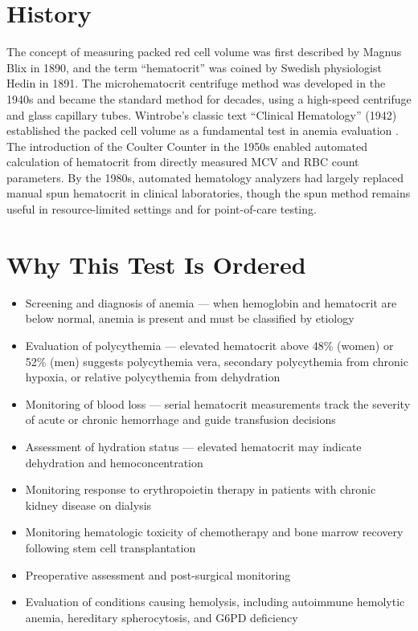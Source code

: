 \section*{History}
The concept of measuring packed red cell volume was first described by Magnus Blix in 1890, and the term ``hematocrit'' was coined by Swedish physiologist Hedin in 1891. The microhematocrit centrifuge method was developed in the 1940s and became the standard method for decades, using a high-speed centrifuge and glass capillary tubes. Wintrobe's classic text ``Clinical Hematology'' (1942) established the packed cell volume as a fundamental test in anemia evaluation \cite{kaushansky2021williams}. The introduction of the Coulter Counter in the 1950s enabled automated calculation of hematocrit from directly measured MCV and RBC count parameters. By the 1980s, automated hematology analyzers had largely replaced manual spun hematocrit in clinical laboratories, though the spun method remains useful in resource-limited settings and for point-of-care testing.

\section*{Why This Test Is Ordered}
\begin{itemize}
  \item Screening and diagnosis of anemia --- when hemoglobin and hematocrit are below normal, anemia is present and must be classified by etiology
  \item Evaluation of polycythemia --- elevated hematocrit above 48\% (women) or 52\% (men) suggests polycythemia vera, secondary polycythemia from chronic hypoxia, or relative polycythemia from dehydration
  \item Monitoring of blood loss --- serial hematocrit measurements track the severity of acute or chronic hemorrhage and guide transfusion decisions
  \item Assessment of hydration status --- elevated hematocrit may indicate dehydration and hemoconcentration
  \item Monitoring response to erythropoietin therapy in patients with chronic kidney disease on dialysis
  \item Monitoring hematologic toxicity of chemotherapy and bone marrow recovery following stem cell transplantation
  \item Preoperative assessment and post-surgical monitoring
  \item Evaluation of conditions causing hemolysis, including autoimmune hemolytic anemia, hereditary spherocytosis, and G6PD deficiency
\end{itemize}

